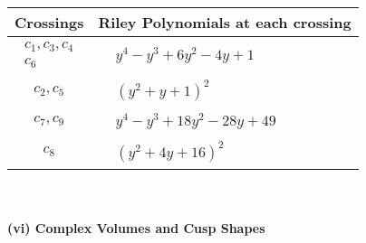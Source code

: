 \documentclass[1p]{elsarticle_modified}
\theoremstyle{definition}
\begin{document}
\begin{tabular}{m{50pt}|m{274pt}}
Crossings & \hspace{64pt}Riley Polynomials at each crossing \\
\hline $$\begin{aligned}c_{1},c_{3},c_{4}\\c_{6}\end{aligned}$$&$\begin{aligned}
&y^4- y^3+6 y^2-4 y+1
\end{aligned}$\\
\hline $$\begin{aligned}c_{2},c_{5}\end{aligned}$$&$\begin{aligned}
&(y^2+y+1)^2
\end{aligned}$\\
\hline $$\begin{aligned}c_{7},c_{9}\end{aligned}$$&$\begin{aligned}
&y^4- y^3+18 y^2-28 y+49
\end{aligned}$\\
\hline $$\begin{aligned}c_{8}\end{aligned}$$&$\begin{aligned}
&(y^2+4 y+16)^2
\end{aligned}$\\
\hline
\end{tabular}\\~\\
\newpage\flushleft \textbf{(vi) Complex Volumes and Cusp Shapes}
\end{document}
